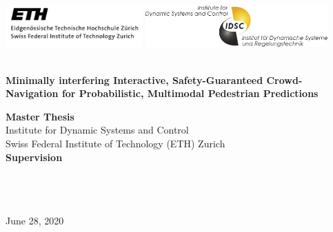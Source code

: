 \begin{titlepage}

\pagestyle{empty}
\begin{center}

\includegraphics[height=1.6cm]{logos/eth_logo}
\hfill
\includegraphics[height=1.6cm]{logos/idsc_logo}

\vspace*{2cm}
{\large \theauthor}
\vspace{2.5cm}

\begin{minipage}{15cm}
\centering
\bfseries \Huge {\thetitle} 
\\\vspace*{1cm}\Large {Minimally interfering Interactive, Safety-Guaranteed Crowd-Navigation for Probabilistic, Multimodal Pedestrian Predictions}
\end{minipage}
\vspace*{4cm}


{\large \textbf{Master Thesis}} \\[3ex]
Institute for Dynamic Systems and Control\\
Swiss Federal Institute of Technology (ETH) Zurich\\

\vspace{2cm}
\textbf{Supervision} \\[1.5ex]
\phdA \\
\phdB \\ 
\supervisorstanford \\ 
\supervisoreth

\vfill
June 28, 2020

\end{center}

\cleardoublepage %
\end{titlepage}
